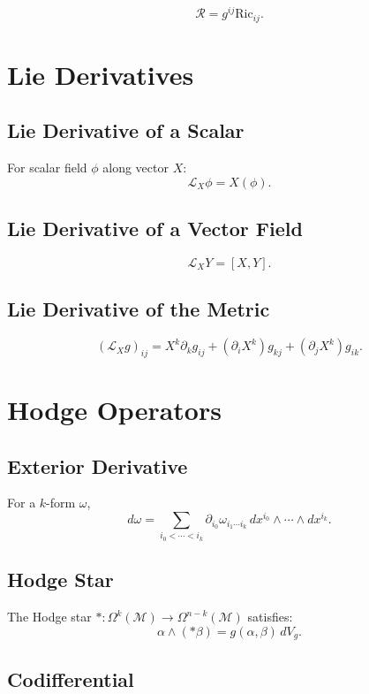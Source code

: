 \[
\mathcal{R} = g^{ij}\mathrm{Ric}_{ij}.
\]

\section{Lie Derivatives}

\subsection{Lie Derivative of a Scalar}

For scalar field $\phi$ along vector $X$:
\[
\mathcal{L}_X \phi = X(\phi).
\]

\subsection{Lie Derivative of a Vector Field}

\[
\mathcal{L}_X Y = [X,Y].
\]

\subsection{Lie Derivative of the Metric}

\[
(\mathcal{L}_X g)_{ij}
  = X^k\partial_k g_{ij}
    + (\partial_i X^k) g_{kj}
    + (\partial_j X^k) g_{ik}.
\]

\section{Hodge Operators}

\subsection{Exterior Derivative}

For a $k$-form $\omega$,
\[
d\omega = \sum_{i_0 < \cdots < i_k}
         \partial_{i_0}\omega_{i_1\cdots i_k}
         \, dx^{i_0}\wedge\cdots\wedge dx^{i_k}.
\]

\subsection{Hodge Star}

The Hodge star $*: \Omega^k(\mathcal{M}) \to \Omega^{n-k}(\mathcal{M})$ satisfies:
\[
\alpha \wedge (\ast \beta)
  = g(\alpha,\beta)\, dV_g.
\]

\subsection{Codifferential}

